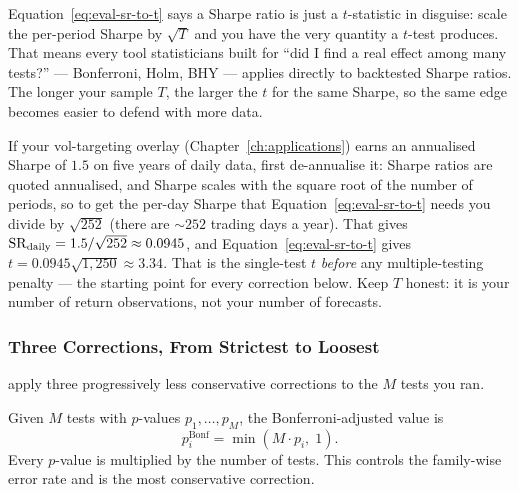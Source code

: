 \begin{intuition}
Equation~\eqref{eq:eval-sr-to-t} says a Sharpe ratio is just a $t$-statistic in disguise: scale the per-period Sharpe by $\sqrt{T}$ and you have the very quantity a $t$-test produces.
That means every tool statisticians built for ``did I find a real effect among many tests?'' --- Bonferroni, Holm, BHY --- applies directly to backtested Sharpe ratios.
The longer your sample $T$, the larger the $t$ for the same Sharpe, so the same edge becomes easier to defend with more data.
\end{intuition}

\begin{projectconnection}
If your vol-targeting overlay (Chapter~\ref{ch:applications}) earns an annualised Sharpe of $1.5$ on five years of daily data, first de-annualise it: Sharpe ratios are quoted annualised, and Sharpe scales with the square root of the number of periods, so to get the per-day Sharpe that Equation~\eqref{eq:eval-sr-to-t} needs you divide by $\sqrt{252}$ (there are ${\sim}252$ trading days a year). That gives $\operatorname{SR}_{\text{daily}} = 1.5/\sqrt{252} \approx 0.0945$, and Equation~\eqref{eq:eval-sr-to-t} gives $t = 0.0945\sqrt{1{,}250} \approx 3.34$.
That is the single-test $t$ \emph{before} any multiple-testing penalty --- the starting point for every correction below.
Keep $T$ honest: it is your number of return observations, not your number of forecasts.
\end{projectconnection}

\subsubsection{Three Corrections, From Strictest to Loosest}

\citet{HarveyLiu2015} apply three progressively less conservative corrections to the $M$ tests you ran.

\begin{definition}
Given $M$ tests with $p$-values $p_1,\ldots,p_M$, the Bonferroni-adjusted value is
\begin{equation}
\label{eq:eval-bonferroni}
p_i^{\text{Bonf}} = \min(M \cdot p_i,\; 1).
\end{equation}
Every $p$-value is multiplied by the number of tests. This controls the family-wise error rate and is the most conservative correction.
\end{definition}

